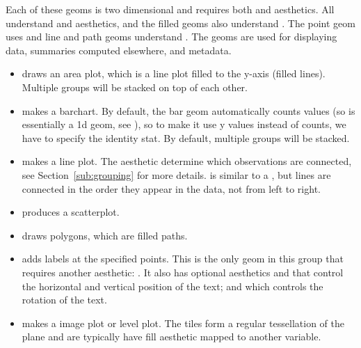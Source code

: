 Each of these geoms is two dimensional and requires both  and  aesthetics.  All understand  and  aesthetics, and the filled geoms also understand .  The point geom uses  and line and path geoms understand . The geoms are used for displaying data, summaries computed elsewhere, and metadata.

\begin{itemize}
  \item {} draws an area plot, which is a line plot filled to the y-axis (filled lines).  Multiple groups will be stacked on top of each other.
  
  \item {} makes a barchart.  By default, the bar geom automatically counts values (so is essentially a 1d geom, see ), so to make it use y values instead of counts, we have to specify the identity stat.  By default, multiple groups will be stacked.
  
  \item {} makes a line plot.  The  aesthetic determine which observations are connected, see Section~\ref{sub:grouping} for more details.  is similar to a , but lines are connected in the order they appear in the data, not from left to right.  
  
  \item {} produces a scatterplot.
  
  \item {} draws polygons, which are filled paths.
  
  \item {} adds labels at the specified points.  This is the only geom in this group that requires another aesthetic: .  It also has optional aesthetics  and  that control the horizontal and vertical position of the text; and  which controls the rotation of the text.
  
  \item {} makes a image plot or level plot.  The tiles form a regular tessellation of the plane and are typically have fill aesthetic mapped to another variable.

\end{itemize}


